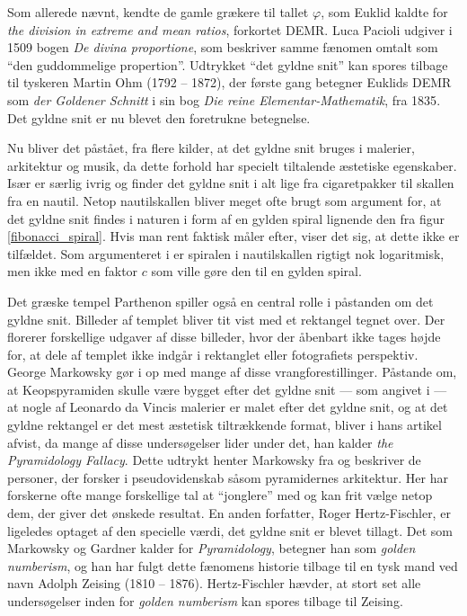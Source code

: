 {
Som allerede nævnt, kendte de gamle grækere til tallet $\varphi$, som
Euklid kaldte for \emph{the division in extreme and mean ratios},
forkortet DEMR. Luca Pacioli udgiver i 1509 bogen \emph{De divina
proportione}, som beskriver samme fænomen omtalt som ``den guddommelige
propertion''. Udtrykket ``det gyldne snit'' kan spores tilbage til
tyskeren Martin Ohm (1792 -- 1872), der første gang betegner Euklids DEMR
som \emph{der Goldener Schnitt} i sin bog \emph{Die reine
Elementar-Mathematik}, fra 1835\cite{Markowsky1992}. Det gyldne snit er
nu blevet den foretrukne betegnelse.

Nu bliver det påstået, fra flere kilder, at det gyldne snit bruges i
malerier, arkitektur og musik, da dette forhold har specielt tiltalende
æstetiske
egenskaber\cite{GoldenNumber,RatioArt,Putz1995,Stakhov2006490,Boussora2004}.
Især \cite{GoldenNumber} er særlig ivrig og finder det gyldne snit i alt
lige fra cigaretpakker til skallen fra en nautil. Netop nautilskallen
bliver meget ofte brugt som argument for, at det gyldne snit findes i
naturen i form af en gylden spiral lignende den fra figur
\ref{fibonacci_spiral}. Hvis man rent faktisk måler efter,
viser det sig, at dette ikke er tilfældet. Som argumenteret i
\cite{Sharp2002} er spiralen i nautilskallen rigtigt nok logaritmisk,
men ikke med en faktor $c$ som ville gøre den til en gylden spiral.

Det græske tempel Parthenon spiller også en central rolle i påstanden om
det gyldne snit. Billeder af templet bliver tit vist med et rektangel
tegnet over. Der florerer forskellige udgaver af disse billeder, hvor
der åbenbart ikke tages højde for, at dele af templet ikke indgår i
rektanglet eller fotografiets perspektiv. George Markowsky gør i
\cite{Markowsky1992} op med mange af disse vrangforestillinger. Påstande
om, at Keopspyramiden skulle være bygget efter det gyldne snit --- som
angivet i \cite{Stakhov2006490} --- at nogle af Leonardo da Vincis malerier
er malet efter det gyldne snit, og at det gyldne rektangel er det mest
æstetisk tiltrækkende format\cite{GoldenNumber,RatioArt}, bliver i
hans artikel afvist, da mange af disse undersøgelser lider under det, han
kalder \emph{the Pyramidology Fallacy}. Dette udtrykt henter Markowsky
fra \cite{Gardner1952_2} og beskriver de personer, der forsker i
pseudovidenskab såsom pyramidernes arkitektur. Her har forskerne ofte
mange forskellige tal at ``jonglere'' med og kan frit vælge netop dem,
der giver det ønskede resultat. En anden forfatter, Roger
Hertz-Fischler, er ligeledes optaget af den specielle værdi, det gyldne
snit er blevet tillagt. Det som Markowsky og Gardner kalder for
\emph{Pyramidology}, betegner han som \emph{golden numberism}, og han har
fulgt dette fænomens historie tilbage til en tysk mand ved navn
Adolph Zeising (1810 -- 1876)\cite{Herz-Fischler2005}. Hertz-Fischler
hævder, at stort set alle undersøgelser inden for \emph{golden numberism}
kan spores tilbage til Zeising.

}
